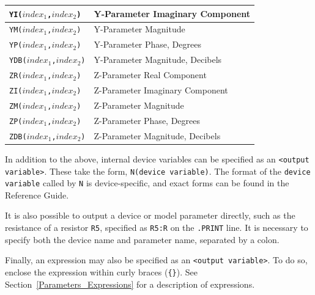 \begin{table}[!htb]
\begin{tabularx}{\linewidth}{|Y|Y|}
    \texttt{YI($index_1$,$index_2$)} & Y-Parameter Imaginary Component \\ \hline
    \texttt{YM($index_1$,$index_2$)} & Y-Parameter Magnitude \\ \hline
    \texttt{YP($index_1$,$index_2$)} & Y-Parameter Phase, Degrees \\ \hline
    \texttt{YDB($index_1$,$index_2$)} & Y-Parameter Magnitude, Decibels \\ \hline
    \texttt{ZR($index_1$,$index_2$)} & Z-Parameter Real Component \\ \hline
    \texttt{ZI($index_1$,$index_2$)} & Z-Parameter Imaginary Component \\ \hline
    \texttt{ZM($index_1$,$index_2$)} & Z-Parameter Magnitude \\ \hline
    \texttt{ZP($index_1$,$index_2$)} & Z-Parameter Phase, Degrees \\ \hline
    \texttt{ZDB($index_1$,$index_2$)} & Z-Parameter Magnitude, Decibels
  \end{tabularx}
\end{table}

In addition to the above, internal device variables can be specified as an
\texttt{<output variable>}.  These take the form, \texttt{N(device variable)}.
The format of the \texttt{device variable} called by \texttt{N} is
device-specific, and exact forms can be found in the \Xyce{} Reference
Guide\ReferenceGuide{}.

It is also possible to output a device or model parameter directly, such as 
the resistance of a resistor \texttt{R5}, specified as \texttt{R5:R} on the \texttt{.PRINT} line.
It is necessary to specify both the device name and parameter name,
separated by a colon.

Finally, an expression may also be specified as an \texttt{<output
variable>}. To do so, enclose the expression within curly braces
(\texttt{\{\}}).  See Section~\ref{Parameters_Expressions} for a description of
expressions.


